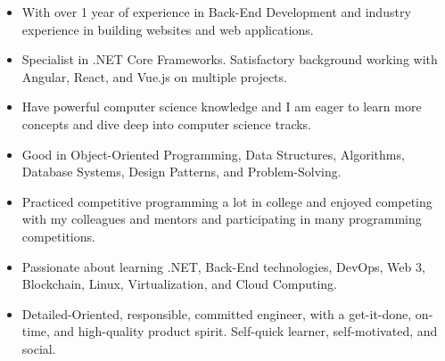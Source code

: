 \documentclass[10pt,a4paper,ragged2e,withhyper]{altacv}
\begin{document}
\begin{paracol}{2}
\begin{itemize}
    \item With over 1 year of experience in Back-End Development and industry experience in building websites and web applications.
    \item Specialist in .NET Core Frameworks. Satisfactory background working with Angular, React, and Vue.js on multiple projects.
    \item Have powerful computer science knowledge and I am eager to learn more concepts and dive deep into computer science tracks.
    \item Good in Object-Oriented Programming, Data Structures, Algorithms, Database Systems, Design Patterns, and Problem-Solving.
    \item Practiced competitive programming a lot in college and enjoyed competing with my colleagues and mentors and participating in many programming competitions.
    \item Passionate about learning .NET, Back-End technologies, DevOps, Web 3, Blockchain, Linux, Virtualization, and Cloud Computing.
    \item Detailed-Oriented, responsible, committed engineer, with a get-it-done, on-time, and high-quality product spirit. Self-quick learner, self-motivated, and social.
\end{itemize}


\\

\divider

\\
\\
\\
\\
\\

\divider

\\
\\
\\
\\
\\
\\
\\
\\
\\


\end{paracol}
\end{document}
